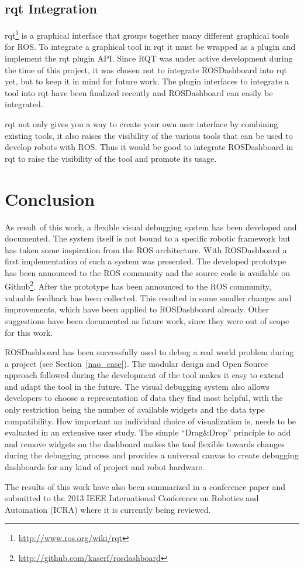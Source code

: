 \subsection{rqt Integration}

rqt\footnote{\url{http://www.ros.org/wiki/rqt}} is a graphical interface that groups together many different graphical tools for ROS. To integrate a graphical tool in rqt it must be wrapped as a plugin and implement the rqt plugin API.
Since RQT was under active development during the time of this project, it was chosen not to integrate ROSDashboard into rqt yet, but to keep it in mind for future work. The plugin interfaces to integrate a tool into rqt have been finalized recently and ROSDashboard can easily be integrated.

rqt not only gives you a way to create your own user interface by combining existing tools, it also raises the visibility of the various tools that can be used to develop robots with ROS. Thus it would be good to integrate ROSDashboard in rqt to raise the visibility of the tool and promote its usage.

\section{Conclusion}

As result of this work, a flexible visual debugging system has been developed and documented. The system itself is not bound to a specific robotic framework but has taken some inspiration from the ROS architecture. With ROSDashboard a first implementation of such a system was presented. The developed prototype has been announced to the ROS community and the source code is available on Github\footnote{\url{http://github.com/kaserf/rosdashboard}}. After the prototype has been announced to the ROS community, valuable feedback has been collected. This resulted in some smaller changes and improvements, which have been applied to ROSDashboard already. Other suggestions have been documented as future work, since they were out of scope for this work.

ROSDashboard has been successfully used to debug a real world problem during a project (see Section~\ref{nao_case}). The modular design and Open Source approach followed during the development of the tool makes it easy to extend and adapt the tool in the future. The visual debugging system also allows developers to choose a representation of data they find most helpful, with the only restriction being the number of available widgets and the data type compatibility. How important an individual choice of visualization is, needs to be evaluated in an extensive user study. The simple ``Drag\&Drop'' principle to add and remove widgets on the dashboard makes the tool flexible towards changes during the debugging process and provides a universal canvas to create debugging dashboards for any kind of project and robot hardware.


The results of this work have also been summarized in a conference paper and submitted to the 2013 IEEE International Conference on Robotics and Automation (ICRA) where it is currently being reviewed.
